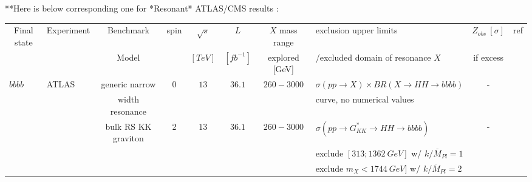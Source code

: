 **Here is below corresponding one for *Resonant* ATLAS/CMS results :
\begin{table}[h!]
\tiny
\scalebox{0.85}
{
\hspace{-2.2cm}
\begin{tabular}{|l|l|c|c|c|c|c|l|c|c|}
\hline
\multicolumn{1}{|c|}{Final state}    &Experiment    &Benchmark            &spin    &$\sqrt{s}$    &$L$        &$X$ mass range        &exclusion upper limits                &$Z_{obs}\ [\sigma]$ &ref\\
\multicolumn{1}{|c|}{}            &        &Model                &    &$[TeV]$    &$[fb^{-1}]$    &explored [GeV]        &/excluded domain of resonance $X$        &if excess    &\\
\hline
$bb bb$                    &ATLAS        &generic narrow            &0    &$13$        &$36.1$        &$260-3000$        &$\sigma(pp\rightarrow X)\times BR(X\rightarrow HH\rightarrow bbbb)$             &-    &\cite{Aaboud:2018knk}\\
                    &        &width resonance        &    &        &        &            &curve, no numerical values                                &    &\\
\cline{3-10}
                    &        &bulk RS KK graviton        &2    &$13$        &$36.1$        &$260-3000$        &$\sigma(pp\rightarrow G^*_{KK}\rightarrow HH\rightarrow bbbb)$             &-    &\cite{Aaboud:2018knk}\\
                    &        &                &    &        &        &            &exclude $[313 ; 1362\ GeV]$ w/ $k/\overline{M}_{Pl}=1$                        &    &\\
                    &        &                &    &        &        &            &exclude $m_X<1744\ GeV]$ w/ $k/\overline{M}_{Pl}=2$                        &    &\\


\cline{3-10}




\end{tabular}}
\end{table}
